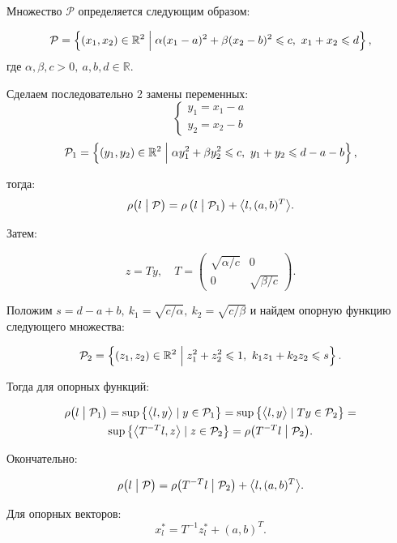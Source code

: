 \documentclass[12pt, a4paper]{article} %
\renewcommand{\le}{\leqslant}
\newcommand{\Real}{\mathbb{R}}
\newcommand{\inner}[2]{\bigl< #1, #2 \bigr>}
\begin{document}
Множество $\mathcal{P}$ определяется следующим образом:

 \[
    \mathcal{P} = \left\{ (x_1, x_2) \in \Real^2 \Bigm| 
    \alpha(x_1 - a)^2 + \beta(x_2 - b)^2 \le c,\
    x_1 + x_2 \le d\right\}
,\] 
где $\alpha, \beta, c > 0,\ a, b, d \in \Real$.

Сделаем последовательно 2 замены переменных:
\[
    \begin{cases}
        y_1 = x_1 - a \\
        y_2 = x_2 - b
    \end{cases} 
\] 
 \[
    \mathcal{P}_1 = \left\{ (y_1, y_2) \in \Real^2 \Bigm| 
    \alpha y_1^2 + \beta y_2^2 \le c,\
    y_1 + y_2 \le d - a - b \right\}
,\] 

тогда:
\[
    \rho \bigl( l \bigm| \mathcal{P} \bigr) =
    \rho \left( l \bigm| \mathcal{P}_1 \right) + \inner{l}{(a, b)^{T}}
.\] 

Затем:

\[
    z = Ty,\quad T = 
    \left( 
        \begin{array}{cc}
            \sqrt{\alpha / c} & 0 \\
            0 & \sqrt{\beta / c}
    \end{array} 
    \right)
.\] 

Положим $s = d - a + b,\ k_1 = \sqrt{c/\alpha},\ k_2 = \sqrt{c/\beta}$
и найдем опорную функцию следующего множества:

 \[
    \mathcal{P}_2 = \left\{ (z_1, z_2) \in \Real^2 \Bigm| 
    z_1^2 + z_2^2 \le 1,\
    k_1 z_1 + k_2 z_2 \le s \right\}
.\] 

Тогда для опорных функций:

\begin{multline*}
    \rho \bigl( l \bigm| \mathcal{P}_1 \bigr) =
    \sup \left\{ \inner{l}{y} \mid y \in \mathcal{P}_1 \right\} =
    \sup \left\{ \inner{l}{y} \mid Ty \in \mathcal{P}_2 \right\} = \\
    \sup \left\{ \inner{T^{-T}l}{z} \mid z \in \mathcal{P}_2 \right\} =
    \rho \bigl( T^{-T}l \bigm| \mathcal{P}_2 \bigr)
.\end{multline*}

Окончательно:

\begin{equation}\label{eq:sup_func}
    \rho \bigl( l \bigm| \mathcal{P} \bigr) =
    \rho \bigl( T^{-T}l \bigm| \mathcal{P}_2 \bigr) + \inner{l}{(a, b)^{T}}
.\end{equation}

Для опорных векторов:
\begin{equation}\label{eq:sup_v}
    x_l^* = T^{-1}z_l^* + (a, b)^{T}
.\end{equation}
\end{document}
